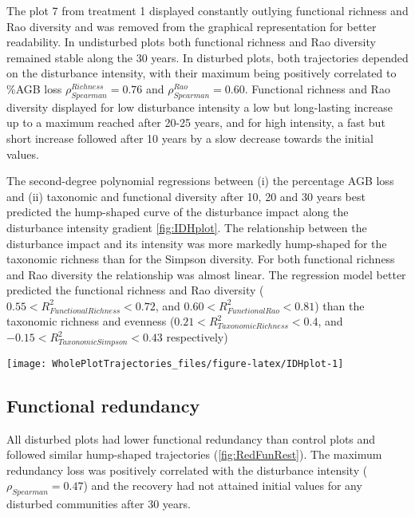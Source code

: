 \documentclass[fleqn,10pt]{ArtEcoFoG} %
\begin{document}
The plot 7 from treatment 1 displayed constantly outlying functional
richness and Rao diversity and was removed from the graphical
representation for better readability. In undisturbed plots both
functional richness and Rao diversity remained stable along the 30
years. In disturbed plots, both trajectories depended on the disturbance
intensity, with their maximum being positively correlated to \%AGB loss
\(\rho_{Spearman}^{Richness}=0.76\) and \(\rho_{Spearman}^{Rao}=0.60\).
Functional richness and Rao diversity displayed for low disturbance
intensity a low but long-lasting increase up to a maximum reached after
20-25 years, and for high intensity, a fast but short increase followed
after 10 years by a slow decrease towards the initial values.

The second-degree polynomial regressions between (i) the percentage AGB
loss and (ii) taxonomic and functional diversity after 10, 20 and 30
years best predicted the hump-shaped curve of the disturbance impact
along the disturbance intensity gradient \ref{fig:IDHplot}. The
relationship between the disturbance impact and its intensity was more
markedly hump-shaped for the taxonomic richness than for the Simpson
diversity. For both functional richness and Rao diversity the
relationship was almost linear. The regression model better predicted
the functional richness and Rao diversity
(\(0.55<R^2_{Functional Richness}<0.72\), and
\(0.60<R^2_{Functional Rao}<0.81\)) than the taxonomic richness and
evenness (\(0.21<R^2_{Taxonomic Richness}<0.4\), and
\(-0.15<R^2_{Taxonomic Simpson}<0.43\) respectively)

\begin{figure*}

{\centering \texttt{[image: WholePlotTrajectories\_files/figure-latex/IDHplot-1]} 

}

\caption{Relationship between the initial \%AGB loss and community taxonomic richness \textbf{(a)}, taxonomic evenness \textbf{(b)}, functional richness \textbf{(c)},and functional evenness \textbf{(d)} at 10, 20 and 30 years after disturbance}\label{fig:IDHplot}
\end{figure*}

\subsection{Functional redundancy}\label{functional-redundancy}

All disturbed plots had lower functional redundancy than control plots
and followed similar hump-shaped trajectories (\ref{fig:RedFunRest}).
The maximum redundancy loss was positively correlated with the
disturbance intensity (\(\rho_{Spearman}=0.47\)) and the recovery had
not attained initial values for any disturbed communities after 30
years.
\end{document}
